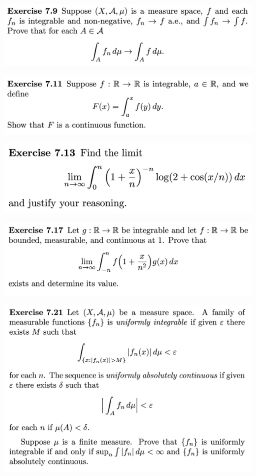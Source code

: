 \begin{mdframed}
\includegraphics[width=400pt]{img/analysis--berkeley-202a-hw08-3203.png}
\end{mdframed}


\begin{mdframed}
\includegraphics[width=400pt]{img/analysis--berkeley-202a-hw08-d0c0.png}
\end{mdframed}

\begin{mdframed}
\includegraphics[width=400pt]{img/analysis--berkeley-202a-hw08-9931.png}
\end{mdframed}


\begin{mdframed}
\includegraphics[width=400pt]{img/analysis--berkeley-202a-hw08-6e60.png}
\end{mdframed}


\begin{mdframed}
\includegraphics[width=400pt]{img/analysis--berkeley-202a-hw08-337f.png}
\end{mdframed}